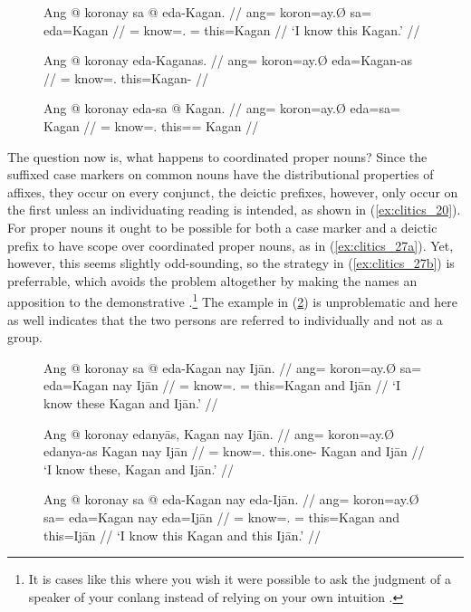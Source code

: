 \begin{figure}[h]
\pex\label{ex:clitics_26}
\a\label{ex:clitics_26a}\begingl
	\gla Ang @ koronay sa @ eda-Kagan. //
	\glb ang= koron=ay.Ø sa= eda=Kagan //
	\glc \AgtT{}= know=\Fsg{}.\Top{} \Parg{}= this=Kagan //
	\glft `I know this Kagan.' //
\endgl

\a\label{ex:clitics_26b}\ljudge{*}\begingl
	\gla Ang @ koronay eda-Kaganas. //
	\glb ang= koron=ay.Ø eda=Kagan-as //
	\glc \AgtT{}= know=\Fsg{}.\Top{} this=Kagan-\Parg{} //
\endgl

\a\label{ex:clitics_26c}\ljudge{*}\begingl
	\gla Ang @ koronay eda-sa @ Kagan. //
	\glb ang= koron=ay.Ø eda=sa= Kagan //
	\glc \AgtT{}= know=\Fsg{}.\Top{} this=\Parg{}= Kagan //
\endgl
\xe
\end{figure}

The question now is, what happens to coordinated proper nouns? Since the
suffixed case markers on common nouns have the distributional properties of
affixes, they occur on every conjunct, the deictic prefixes, however, only
occur on the first unless an individuating reading is intended, as shown in
(\ref{ex:clitics_20}). For proper nouns it ought to be possible for both a case
marker and a deictic prefix to have scope over coordinated proper nouns, as in
(\ref{ex:clitics_27a}). Yet, however, this seems slightly odd-sounding, so the
strategy in (\ref{ex:clitics_27b}) is preferrable, which avoids the problem
altogether by making the names an apposition to the demonstrative
.\footnote{It is cases like this where
you wish it were possible to ask the judgment of a speaker of your conlang
instead of relying on your own intuition%
.} The example in (\ref{ex:clitics_27c}) is
unproblematic and here as well indicates that the two persons are referred to
individually and not as a group.

\begin{figure}[h]
\pex\label{ex:clitics_27}
\a\label{ex:clitics_27a}\begingl
	\gla Ang @ koronay sa @ eda-​Kagan nay Ijān. //
	\glb ang= koron=ay.Ø sa= eda=Kagan nay Ijān //
	\glc \AgtT{}= know=\Fsg{}.\Top{} \Parg{}= this=​Kagan and Ijān //
	\glft `I know these Kagan and Ijān.' //
\endgl

\a\label{ex:clitics_27b}\begingl
	\gla Ang @ koronay edanyās, Kagan nay Ijān. //
	\glb ang= koron=ay.Ø edanya-as Kagan nay Ijān //
	\glc \AgtT{}= know=\Fsg{}.\Top{} this.one-\Parg{} Kagan and Ijān //
	\glft `I know these, Kagan and Ijān.' //
\endgl

\a\label{ex:clitics_27c}\begingl
	\gla Ang @ koronay sa @ eda-​Kagan nay eda-​Ijān. //
	\glb ang= koron=ay.Ø sa= eda=​Kagan nay eda=Ijān //
	\glc \AgtT{}= know=\Fsg{}.\Top{} \Parg{}= this=​Kagan and this=​Ijān //
	\glft `I know this Kagan and this Ijān.' //
\endgl
\xe
\end{figure}

